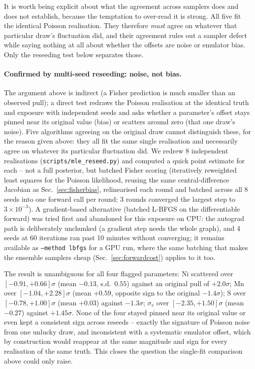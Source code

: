 \documentclass[11pt,a4paper]{article}
\newcommand{\code}[1]{\texttt{#1}}
\begin{document}
It is worth being explicit about what the agreement across samplers does and
does not establish, because the temptation to over-read it is strong. All five
fit the identical Poisson realisation. They therefore \emph{must} agree on
whatever that particular draw's fluctuation did, and their agreement rules out a
sampler defect while saying nothing at all about whether the offsets are noise
or emulator bias. Only the reseeding test below separates those.

\paragraph{Confirmed by multi-seed reseeding: noise, not bias.} The argument
above is indirect (a Fisher prediction is much smaller than an observed pull);
a direct test redraws the Poisson realisation at the identical truth and
exposure with independent seeds and asks whether a parameter's offset stays
pinned near its original value (bias) or scatters around zero (that one draw's
noise). Five algorithms agreeing on the original draw cannot distinguish
these, for the reason given above: they all fit the same single realisation and
necessarily agree on whatever its particular fluctuation did. We redrew 8 independent
realisations (\code{scripts/mle\_reseed.py}) and computed a quick point
estimate for each -- not a full posterior, but batched Fisher scoring
(iteratively reweighted least squares for the Poisson likelihood, reusing the
same central-difference Jacobian as Sec.~\ref{sec:fisherbias}, relinearised
each round and batched across all 8 seeds into one forward call per round; 3
rounds converged the largest step to $3\times10^{-3}$). A gradient-based
alternative (batched L-BFGS on the differentiable forward) was tried first and
abandoned for this exposure on CPU: the autograd path is deliberately
unchunked (a gradient step needs the whole graph), and 4 seeds at 60
iterations ran past 10 minutes without converging; it remains available as
\code{--method lbfgs} for a GPU run, where the same batching that makes the
ensemble samplers cheap (Sec.~\ref{sec:forwardcost}) applies to it too.

The result is unambiguous for all four flagged parameters: $\mathrm{Ni}$
scattered over $[-0.91,+0.66]\sigma$ (mean $-0.13$, s.d.\ $0.55$) against an
original pull of $+2.0\sigma$; $\mathrm{Mn}$ over $[-1.04,+2.28]\sigma$ (mean
$+0.59$, opposite sign to the original $-1.4\sigma$); $\mathrm{S}$ over
$[-0.78,+1.00]\sigma$ (mean $+0.03$) against $-1.3\sigma$; $\sigma_v$ over
$[-2.35,+1.50]\sigma$ (mean $-0.27$) against $+1.45\sigma$. None of the four
stayed pinned near its original value or even kept a consistent sign across
reseeds -- exactly the signature of Poisson noise from one unlucky draw, and
inconsistent with a systematic emulator offset, which by construction would
reappear at the same magnitude and sign for every realisation of the same
truth. This closes the question the single-fit comparison above could only
raise.
\end{document}
